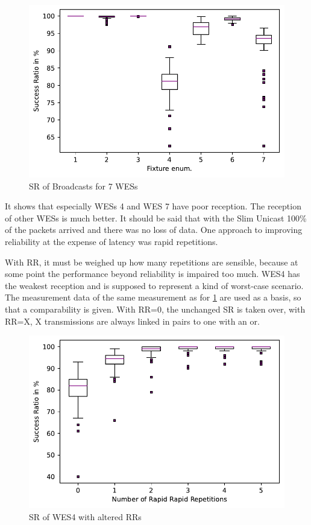 \begin{figure}[h]
	\centering
	\includegraphics[scale=0.6]{../Plot2/Graphs/SR_per_fixture_broadcast.pdf}
	\caption{SR of Broadcasts for 7 WESs}
	\label{fig:sr_broadcast}
\end{figure}

It shows that especially WESs 4 and WES 7 have poor reception.
The reception of other WESs is much better.
It should be said that with the Slim Unicast 100\% of the packets arrived and there was no loss of data.
One approach to improving reliability at the expense of latency was rapid repetitions.

With RR, it must be weighed up how many repetitions are sensible, 
because at some point the performance beyond reliability is impaired too much.
WES4 has the weakest reception and is supposed to represent a kind of worst-case scenario.
The measurement data of the same measurement as for \cref{fig:sr_broadcast} are used as a basis,
so that a comparability is given.
With RR=0, the unchanged SR is taken over, with RR=X, X transmissions are always linked in pairs to one with an or.

\begin{figure}[h]
	\centering
	\includegraphics[scale=0.6]{../Plot2/Graphs/SR_of_node4_rr.pdf}
	\caption{SR of WES4 with altered RRs}
	\label{fig:sr_broadcast_wes4}
\end{figure}

